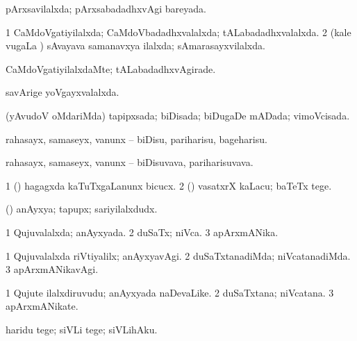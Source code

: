\bentry
{} 
\gl{\gu}
\expl{}
\bmng
pArxsavilalxda; pArxsabadadhxvAgi bareyada. 
\emng
\eentry

\bentry
{} 
\gl{\gu}
\expl{}
\bmng
\bnum
\num{1} CaMdoVgatiyilalxda; CaMdoVbadadhxvalalxda; tALabadadhxvalalxda. 
\num{2} (kale \mo vugaLa \vi) sAvayava samanavxya ilalxda; sAmarasayxvilalxda. 
\enum
\emng
\eentry

\bentry
{} 
\gl{\kirxvi}
\expl{}
\bmng
CaMdoVgatiyilalxdaMte; tALabadadhxvAgirade. 
\emng
\eentry

\bentry
{} 
\gl{\gu}
\expl{}
\bmng
savArige yoVgayxvalalxda. 
\emng
\eentry

\bentry
{} 
\gl{\gu}
\expl{}
\bmng
(yAvudoV oMdariMda) tapipxsada; biDisada; biDugaDe mADada; vimoVcisada. 
\emng
\eentry

\bentry
{} 
\gl{\akirx}
\expl{}
\bmng
rahasayx, samaseyx, \mo vanunx -- biDisu, pariharisu, bageharisu. 
\emng
\eentry

\bentry
{} 
\gl{\nA}
\expl{}
\bmng
rahasayx, samaseyx, \mo vanunx -- biDisuvava, pariharisuvava. 
\emng
\eentry

\bentry
{} 
\gl{\sakirx}
\bmng
\bnum
\num{1} (\nw) hagagxda kaTuTxgaLanunx bicucx. 
\num{2} (\pArxM) vasatxrX kaLacu; baTeTx tege. 
\enum
\emng
\eentry

\bentry
{} 
\gl{\nA}
\expl{}
\bmng
(\pArxparx) anAyxya; tapupx; sariyilalxdudx. 
\emng
\eentry

\bentry
{} 
\gl{\gu}
\expl{}
\bmng
\bnum
\num{1} Qujuvalalxda; anAyxyada. 
\num{2} duSaTx; niVca. 
\num{3} apArxmANika. 
\enum
\emng
\eentry

\bentry
{} 
\gl{\kirxvi}
\expl{}
\bmng
\bnum
\num{1} Qujuvalalxda riVtiyalilx; anAyxyavAgi. 
\num{2} duSaTxtanadiMda; niVcatanadiMda. 
\num{3} apArxmANikavAgi. 
\enum
\emng
\eentry

\bentry
{} 
\gl{\nA}
\expl{}
\bmng
\bnum
\num{1} Qujute ilalxdiruvudu; anAyxyada naDevaLike. 
\num{2} duSaTxtana; niVcatana. 
\num{3} apArxmANikate. 
\enum
\emng
\eentry

\bentry
{} 
\gl{\akirx}
\bmng
haridu tege; siVLi tege; siVLihAku. 
\emng
\eentry

